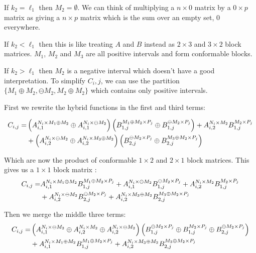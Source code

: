 \documentclass{letter}
\begin{document}
If $k_2 = \ell_1$ then $M_2 = \emptyset$.
We can think of multiplying a $n \times 0$ matrix by a $0 \times p$ matrix as giving a $n \times p$ matrix which is the sum
over an empty set, 0 everywhere.

If $k_2 < \ell_1$ then this is like treating $A$ and $B$ instead as $2 \times 3$ and $3 \times 2$ block matrices.
$M_1$, $M_2$ and $M_3$ are all positive intervals and form conformable blocks.

If $k_2 > \ell_1$ then $M_2$ is a negative interval which doesn't have a good interpretation.
To simplify $C_i,j$, we can use the partition $ \{ M_1 \oplus M_2, \ominus M_2, M_2 \oplus M_2 \}$ which contains only
positive intervals.


First we rewrite the hybrid functions in the first and third terms:


\begin{align}
	C_{i,j} 	= &\left( A_{i,1}^{N_i \times M_1 \oplus M_2} \oplus A_{i,1}^{N_i \times \ominus M_2} \right)
				\left( B_{1,j}^{M_1 \oplus M_2 \times P_j} \oplus B_{1,j}^{\ominus M_2 \times P_j} \right)
			+ A_{i,2}^{N_i \times M_2} B_{1,j}^{M_2 \times P_j} \notag\\
			&+ \left( A_{i,2}^{N_i \times \ominus M_2} \oplus A_{i,2}^{N_i \times M_3 \oplus M_2} \right)
			 \left( B_{2,j}^{\ominus M_2 \times P_j} \oplus B_{2,j}^{M_3 \oplus M_2 \times P_j} \right)
\end{align}

Which are now the product of conformable $1 \times 2$ and $2 \times 1$ block matrices.
This gives us a $1 \times 1$ block matrix :
\begin{align}
	C_{i,j} 	= & A_{i,1}^{N_i \times M_1 \oplus M_2} B_{1,j}^{M_1 \oplus M_2 \times P_j}
			+ A_{i,1}^{N_i \times \ominus M_2} B_{1,j}^{\ominus M_2 \times P_j}
			+ A_{i,2}^{N_i \times M_2} B_{1,j}^{M_2 \times P_j} \notag\\
			&+ A_{i,2}^{N_i \times \ominus M_2} B_{2,j}^{\ominus M_2 \times P_j}
			+ A_{i,2}^{N_i \times M_3 \oplus M_2} B_{2,j}^{M_3 \oplus M_2 \times P_j}
\end{align}

Then we merge the middle three terms:
\begin{align}
	C_{i,j} 	=& \left( A_{i,1}^{N_i \times \ominus M_2} 
				\oplus  A_{i,2}^{N_i \times M_2} 
				\oplus A_{i,2}^{N_i \times \ominus M_2} \right)
			\left( B_{1,j}^{\ominus M_2 \times P_j} 
				\oplus B_{1,j}^{M_2 \times P_j} 
				\oplus B_{2,j}^{\ominus M_2 \times P_j} \right)\notag\\
			&+ A_{i,1}^{N_i \times M_1 \oplus M_2} B_{1,j}^{M_1 \oplus M_2 \times P_j} 
			+ A_{i,2}^{N_i \times M_3 \oplus M_2} B_{2,j}^{M_3 \oplus M_2 \times P_j} 
\end{align}
\end{document}
